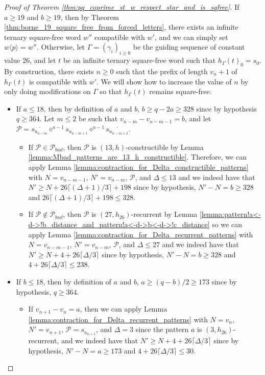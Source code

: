 \documentclass[12pt]{article}
\theoremstyle{definition}
\newcommand{\pattern}[3]{{#1}\diamond^{#2 - 1}{#3}}
\newcommand{\subsequence}[2]{#1\langle#2\rangle}
\begin{document}
\begin{proof}[Proof of Theorem \ref{thm:pq_coprime_st_w_respect_star_and_is_sqfree}]
    If $a \ge 19$ and $b \ge 19$, then by Theorem \ref{thm:borne_19_square_free_from_forced_letters}, there exists an infinite ternary square-free word $w''$ compatible with $w'$, and we can simply set $\subsequence{w}{p} = w''$. Otherwise, let $\Gamma = (\gamma_i)_{i \ge 0}$ be the guiding sequence of constant value $26$, and let $t$ be an infinite ternary square-free word such that $h_\Gamma(t)_0 = s_0$. By construction, there exists $n \ge 0$ such that the prefix of length $v_n + 1$ of $h_\Gamma(t)$ is compatible with $w'$. We will show how to increase the value of $n$ by only doing modifications on $\Gamma$ so that $h_\Gamma(t)$ remains square-free.
\begin{itemize}
    \item If $a \le 18$, then by definition of $a$ and $b$, $b \ge q - 2a \ge 328$ since by hypothesis $q \ge 364$.  Let $m \le 2$ be such that $v_{n - m} - v_{n - m - 1} = b$, and let $\mathcal{P} = \pattern{\overline{s_{u_{n - m}}}}{a}{s_{u_{n - m + 1}}}\pattern{}{a}{\overline{s_{u_{n - m + 2}}}}$. 
    \begin{itemize}
        \item If $\mathcal{P} \in \mathcal{P}_{bad}$, then $\mathcal{P}$ is $(13, h)$-constructible by Lemma \ref{lemma:Mbad_patterns_are_13_h_constructible}. Therefore, we can apply Lemma \ref{lemma:contraction_for_Delta_constructible_patterns} with $N = v_{n - m - 1}$, $N' = v_{n - m}$, $\mathcal{P}$, and $\Delta \le 13$ and we indeed have that $N' \ge N + 26\lceil(\Delta + 1)/3\rceil + 198$ since by hypothesis, $N' - N = b \ge 328$ and $26\lceil(\Delta + 1)/3\rceil + 198 \le 328$.
        \item If $\mathcal{P} \not\in \mathcal{P}_{bad}$, then $\mathcal{P}$ is $(27, h_{26})$-recurrent by Lemma \ref{lemma:pattern!a<-d->!b_distance_and_pattern!a<-d->b<-d->!c_distance} so we can apply 
        Lemma \ref{lemma:contraction_for_Delta_recurrent_patterns} with $N = v_{n - m - 1}$, $N' = v_{n - m}$, $\mathcal{P}$, and $\Delta \le 27$ and we indeed have that 
        $N'\ge N + 4 + 26\lceil\Delta/3\rceil$ 
        since by hypothesis, $N' - N = b \ge 328$ and $4 + 26\lceil\Delta/3\rceil \le 238$.
    \end{itemize}
    \item If $b \le 18$, then by definition of $a$ and $b$, $a \ge (q - b)/2 \ge 173$ since by hypothesis, $q \ge 364$.
    \begin{itemize}
        \item If $v_{n + 1} - v_n = a$, then we can apply Lemma \ref{lemma:contraction_for_Delta_recurrent_patterns} with $N = v_n$, $N' = v_{n + 1}$, $\mathcal{P} = s_{u_{n + 1}}$, and $\Delta = 3$ since the pattern $a$ is $(3, h_{26})$-recurrent, and we indeed have that $N' \ge N + 4 + 26\lceil\Delta/3\rceil$ since by hypothesis,  $N' - N = a \ge 173$ and $4 + 26\lceil\Delta/3\rceil \le 30$.

\end{itemize}
\end{itemize}
\end{proof}
\end{document}
